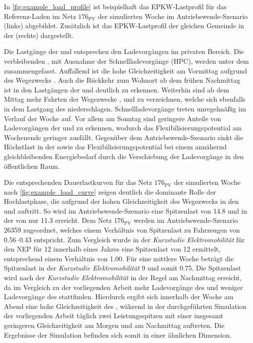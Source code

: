 

In \autoref{fig:example_load_profile} ist beispielhaft das \gls{EPKW}-Lastprofil für das Referenz-Laden im Netz \(176_{\text{PV}}\) der simulierten Woche im Antriebswende-Szenario (links) abgebildet.
Zusätzlich ist das \gls{EPKW}-Lastprofil der gleichen Gemeinde in der \SzeFirmenparkplatz (rechts) dargestellt.



Die Lastgänge der \UCs \zH und \Firmeparkplatz entsprechen den Ladevorgängen im privaten Bereich.
Die verbleibenden \UCsdot, mit Ausnahme der Schnellladevorgänge (\gls{HPC}), werden unter dem \UC \oeffen zusammengefasst.
Auffallend ist die hohe Gleichzeitigkeit am Vormittag aufgrund des Wegezwecks \Arbeitdot.
Auch die Rückkehr zum Wohnort ab dem frühen Nachmittag ist in den Lastgängen der \UCs \zH und \oeffen deutlich zu erkennen.
Weiterhin sind ab dem Mittag mehr Fahrten der Wegezwecke \Einkaufdot, \Erledigung und \Freizeit zu verzeichnen, welche sich ebenfalls in dem Lastgang des \UC \oeffen niederschlagen.
Schnellladevorgänge treten unregelmäßig im Verlauf der Woche auf.
Vor allem am Sonntag sind geringere Anteile von Ladevorgängen der \UCs \zH und \Firmeparkplatz zu erkennen, wodurch das Flexibilisierungspotential am Wochenende geringer ausfällt.
Gegenüber dem Antriebswende-Szenario sinkt die Höchstlast in der \SzeFirmenparkplatz sowie das Flexibilisierungspotential bei einem annähernd gleichbleibenden Energiebedarf durch die Verschiebung der Ladevorgänge in den öffentlichen Raum.\medskip

Die entsprechenden Dauerlastkurven für das Netz \(176_{\text{PV}}\) der simulierten Woche nach \autoref{fig:example_load_curve} zeigen deutlich die dominante Rolle der Hochlastphase, die aufgrund der hohen Gleichzeitigkeit des Wegezwecks \Arbeit in den \UCs \Firmeparkplatz und \Straszenrand auftritt.
So wird im Antriebswende-Szenario eine Spitzenlast von \SI{14.8}{\mw} und in der \SzeFirmenparkplatz von nur \SI{11.3}{\mw} erreicht.
Dem Netz \(176_{\text{PV}}\) werden im Antriebswende-Szenario \SI{26359}{\FZ} zugeordnet, welches einem Verhältnis von Spitzenlast zu Fahrzeugen von \SIrange[range-phrase=~bzw.~]{0.56}{0.43}{\kWperFZ} entspricht.
Zum Vergleich wurde in der \textit{Kurzstudie Elektromobilität} für den \gls{NEP} \cite{Ebner2019} für \SI{12}{\MioStk} innerhalb eines Jahres eine Spitzenlast von \SI{12}{\gw} ermittelt, entsprechend einem Verhältnis von \SI{1.00}{\kWperFZ}.
Für eine mittlere Woche beträgt die Spitzenlast in der \textit{Kurzstudie Elektromobilität} \SI{9}{\gw} und somit \SI{0.75}{\kWperFZ}.
Die Spitzenlast wird nach der \textit{Kurzstudie Elektromobilität} in der Regel am Nachmittag erreicht, da im Vergleich zu der vorliegenden Arbeit mehr Ladevorgänge des \UC \zH und weniger Ladevorgänge des \UC \Firmeparkplatz stattfinden.
Hierdurch ergibt sich innerhalb der Woche am Abend eine hohe Gleichzeitigkeit des \UC \zHdot, während in der durchgeführten Simulation der vorliegenden Arbeit täglich zwei Leistungsspitzen mit einer insgesamt geringeren Gleichzeitigkeit am Morgen und am Nachmittag auftreten.
Die Ergebnisse der Simulation befinden sich somit in einer ähnlichen Dimension.

